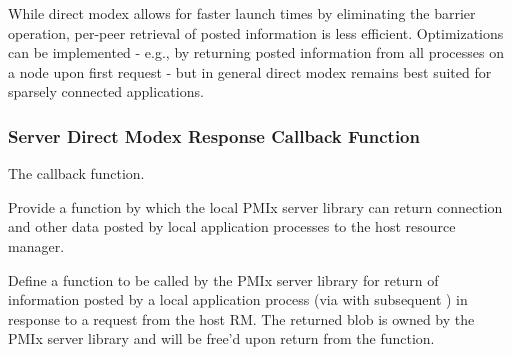 \adviceuserstart
While direct modex allows for faster launch times by eliminating the barrier operation, per-peer retrieval of posted information is less efficient. Optimizations can be implemented - e.g., by returning posted information from all processes on a node upon first request - but in general direct modex remains best suited for sparsely connected applications.
\adviceuserend

\subsubsection{Server Direct Modex Response Callback Function}

The  callback function.

\summary

Provide a function by which the local \ac{PMIx} server library can return connection and other data posted by local application processes to the host resource manager.

\format


\begin{arglist}
\end{arglist}

\descr
Define a function to be called by the PMIx server library for return of information posted by a local application process (via  with subsequent ) in response to a request from the host RM. The returned  blob is owned by the PMIx server library and will be free’d upon return from the function.



